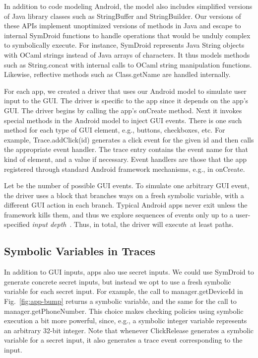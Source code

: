 \documentclass{llncs}
\newcommand{\code}[1]{\textsf{#1}} \newcommand{\bcode}[1]{\texttt{#1}}
\newcommand{\toolname}{ClickRelease\xspace}
\begin{document}
In addition to code modeling Android, the model also
includes simplified versions of Java library classes such as
\code{StringBuffer} and \code{StringBuilder}.  Our versions of
these APIs implement unoptimized versions of methods in
Java and escape to internal SymDroid functions to handle operations that
would be unduly complex to symbolically execute. For instance, SymDroid
represents Java \code{String} objects with OCaml strings instead of
Java arrays of characters. It thus models methods such as \code{String.concat}
with internal calls to OCaml string manipulation functions. Likewise,
reflective methods such as \code{Class.getName} are handled internally.

For each app, we created a driver that uses our Android model to simulate user
input to the GUI. The driver is specific to the app since it depends on the
app's GUI.  The driver begins by calling the app's \code{onCreate}
method. 
Next it invokes special
methods in the Android model to inject GUI events. There is one such method for
each type of GUI element, e.g., buttons, checkboxes, etc. 
For example,
\code{Trace.addClick(id)} generates a click event for the given
\code{id} and then calls the appropriate event handler.
The trace entry contains the event name for that kind of element,
and a value if necessary. 
Event handlers are those
that the app registered through standard Android framework mechanisms,
e.g., in \code{onCreate}.

Let  be the number of possible GUI events.  To simulate one
arbitrary GUI event, the driver uses a block that branches  ways on
a fresh symbolic variable, with a different GUI action in each branch.
Typical Android apps never exit unless the framework kills them, and
thus we explore sequences of events only up to a user-specified
\emph{input depth}~. Thus, in total, the driver will execute
at least  paths.

\subsection{Symbolic Variables in Traces}
\label{sec:symbolic-traces}

In addition to GUI inputs, apps also use secret inputs. We could use
SymDroid to generate concrete secret inputs, but instead we opt to use
a fresh symbolic variable for each secret input. For example, the call
to \code{manager.getDeviceId} in Fig.~\ref{fig:app-bump} returns a
symbolic variable, and the same for the call to
\code{manager.getPhoneNumber}. This choice makes checking policies
using symbolic execution a bit more powerful, since, e.g., a symbolic
integer variable represents an arbitrary 32-bit integer. Note that
whenever \toolname generates a symbolic variable for a secret input, it
also generates a trace event corresponding to the input.
\end{document}
